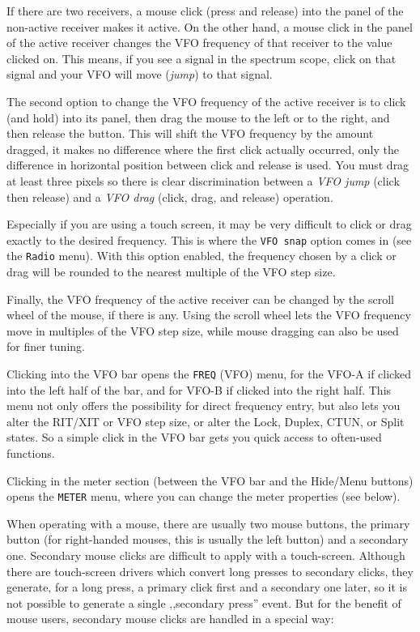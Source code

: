 \documentclass[12pt]{book}
\def\rett#1{\texttt{\color{red}#1}}
\def\bltt#1{\texttt{\color{blue}#1}}
\begin{document}
If there are two receivers, a mouse click (press and release) into
the panel of the non-active receiver makes it active. On the other
hand, a mouse click in the panel of the active receiver changes
the VFO frequency of that receiver to the value clicked on.
This means, if you see a signal in the spectrum scope, click
on that signal and your VFO will move (\textit{jump}) to that signal.

The second option to change the VFO frequency of the active receiver
is to click (and hold) into its panel, then drag the mouse to the left
or to the right, and then release the button. This will shift the
VFO frequency by the amount dragged, it makes no difference
where the first click actually occurred, only the difference
in horizontal position between click and release is used. You must
drag at least three pixels so there is clear discrimination between
a \textit{VFO jump} (click then release) and a \textit{VFO drag} (click, drag,
and release) operation.

Especially if you are using a touch screen, it may be very difficult
to click or drag exactly to the desired frequency. This is where
the \rett{VFO snap} option comes in (see the \bltt{Radio} menu).
With this option enabled, the frequency chosen by a click or drag
will be rounded to the nearest multiple of the VFO step size.

 Finally, the VFO frequency of the active
receiver can be changed by the scroll wheel of the mouse, if there
is any. Using the scroll wheel lets the VFO frequency move in multiples
of the VFO step size, while mouse dragging can also be used for
finer tuning.

Clicking into the VFO bar opens the \bltt{FREQ} (VFO) menu,
for the VFO-A if clicked into the left half of the bar, and for
VFO-B if clicked into the right half. This menu not only offers
the possibility for direct frequency entry, but also lets you
alter the RIT/XIT or VFO step size, or alter the Lock, Duplex,
CTUN, or Split states. So a simple click in the VFO bar
gets you quick access to often-used functions.

Clicking in the meter section (between the VFO bar and the
Hide/Menu buttons) opens the \bltt{METER} menu, where
you can change the meter properties (see below).

When operating with a mouse, there are usually two mouse buttons,
the primary button (for right-handed mouses, this is usually
the left button) and a secondary one. Secondary mouse clicks
are difficult to apply with a touch-screen. Although there are
touch-screen drivers which convert long presses to secondary clicks,
they generate, for a long press, a primary click first and a
secondary one later, so it is not possible to generate a
single ,,secondary press'' event. But for the benefit of
mouse users, secondary mouse clicks are handled in a special way:
\end{document}
